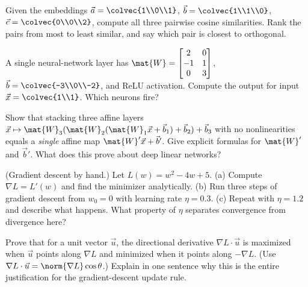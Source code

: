 \begin{exercise}
Given the embeddings $\vec{a}=\colvec{1\\0\\1}$, $\vec{b}=\colvec{1\\1\\0}$,
$\vec{c}=\colvec{0\\0\\2}$, compute all three pairwise cosine similarities. Rank the pairs
from most to least similar, and say which pair is closest to orthogonal.
\end{exercise}

\begin{exercise}
A single neural-network layer has
$\mat{W}=\begin{bmatrix}2&0\\-1&1\\0&3\end{bmatrix}$, $\vec{b}=\colvec{-3\\0\\-2}$, and
ReLU activation. Compute the output for input $\vec{x}=\colvec{1\\1}$. Which neurons fire?
\end{exercise}

\begin{exercise}
Show that stacking three affine layers $\vec{x}\mapsto\mat{W}_3(\mat{W}_2(\mat{W}_1\vec{x}
+\vec{b}_1)+\vec{b}_2)+\vec{b}_3$ with no nonlinearities equals a \emph{single} affine map
$\mat{W}'\vec{x}+\vec{b}'$. Give explicit formulas for $\mat{W}'$ and $\vec{b}'$. What does
this prove about deep linear networks?
\end{exercise}

\begin{exercise}
(Gradient descent by hand.) Let $L(w)=w^2-4w+5$.
(a) Compute $\nabla L = L'(w)$ and find the minimizer analytically.
(b) Run three steps of gradient descent from $w_0=0$ with learning rate $\eta=0.3$.
(c) Repeat with $\eta=1.2$ and describe what happens. What property of $\eta$ separates
convergence from divergence here?
\end{exercise}

\begin{exercise}
Prove that for a unit vector $\vec{u}$, the directional derivative $\nabla L\cdot\vec{u}$
is maximized when $\vec{u}$ points along $\nabla L$ and minimized when it points along
$-\nabla L$. (Use $\nabla L\cdot\vec{u}=\norm{\nabla L}\cos\theta$.) Explain in one
sentence why this is the entire justification for the gradient-descent update rule.
\end{exercise}


